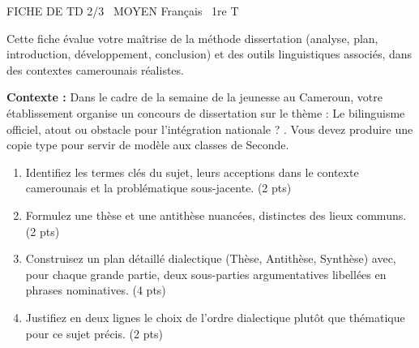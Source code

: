 \documentclass[11pt]{article}
\begin{document}
\begin{tcolorbox}[enhanced,colback=popink,colframe=popink,arc=10pt,boxrule=0pt,left=12pt,right=12pt,top=9pt,bottom=9pt]
{\color{white}\popxbold\small FICHE DE TD 2/3 \textbullet\ MOYEN \hfill Français \textbullet\ 1re T\par}
\end{tcolorbox}
\vspace{4pt}
\noindent Cette fiche évalue votre maîtrise de la méthode dissertation (analyse, plan, introduction, développement, conclusion) et des outils linguistiques associés, dans des contextes camerounais réalistes.

\begin{exercice}
\textbf{Contexte :} Dans le cadre de la semaine de la jeunesse au Cameroun, votre établissement organise un concours de dissertation sur le thème : \og Le bilinguisme officiel, atout ou obstacle pour l'intégration nationale ? \fg{}. Vous devez produire une copie type pour servir de modèle aux classes de Seconde.

\begin{enumerate}
    \item Identifiez les termes clés du sujet, leurs acceptions dans le contexte camerounais et la problématique sous-jacente. (2 pts)
    \item Formulez une thèse et une antithèse nuancées, distinctes des lieux communs. (2 pts)
    \item Construisez un plan détaillé dialectique (Thèse, Antithèse, Synthèse) avec, pour chaque grande partie, deux sous-parties argumentatives libellées en phrases nominatives. (4 pts)
    \item Justifiez en deux lignes le choix de l'ordre dialectique plutôt que thématique pour ce sujet précis. (2 pts)
\end{enumerate}
\end{exercice}
\end{document}
